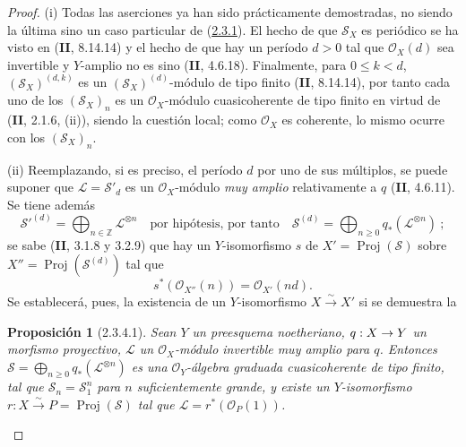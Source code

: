 \documentclass[10pt,oneside,openany]{book}
\theoremstyle{egaenv}\newtheorem*{env}{---}
\theoremstyle{egastatement}
\newtheorem*{proposition}{Proposición}
\theoremstyle{egadescription}
\newcommand{\oldpage}[2][]{\marginnote{\normalfont\scriptsize\textbf{#1}\,|\,#2}\ignorespaces}
\renewcommand{\leq}{\leqslant}
\renewcommand{\geq}{\geqslant}
\renewcommand{\to}{\mathchoice{\longrightarrow}{\rightarrow}{\rightarrow}{\rightarrow}}
\begin{document}
\begin{proof}
(i) Todas las aserciones ya han sido prácticamente demostradas, no siendo la última sino un caso particular de (\hyperref[III.2.3.1-fr]{2.3.1}). El hecho de que $\mathcal S_X$ es periódico se ha visto en (\textbf{II}, 8.14.14) y el hecho de que hay un período $d>0$ tal que $\mathcal O_X(d)$ sea invertible y $Y$-amplio no es sino (\textbf{II}, 4.6.18). Finalmente, para $0\leq k<d$, $(\mathcal S_X)^{(d,k)}$ es un $(\mathcal S_X)^{(d)}$-módulo de tipo finito (\textbf{II}, 8.14.14), por tanto cada uno de los $(\mathcal S_X)_n$ es un $\mathcal O_X$-módulo cuasicoherente de tipo finito en virtud de (\textbf{II}, 2.1.6, (ii)), siendo la cuestión local; como $\mathcal O_X$ es coherente, lo mismo ocurre con los $(\mathcal S_X)_n$.

(ii) Reemplazando, si es preciso, el período $d$ por uno de sus múltiplos, se puede suponer que $\mathcal L=\mathcal S'_d$ es un $\mathcal O_X$-módulo \emph{muy amplio} relativamente a $q$ (\textbf{II}, 4.6.11). Se tiene además
\[
\mathcal S'^{(d)}=\bigoplus_{n\in\mathbb Z}\mathcal L^{\otimes n}
\quad\text{por hipótesis, por tanto}\quad
\mathcal S^{(d)}=\bigoplus_{n\geq0}q_*(\mathcal L^{\otimes n})~;
\]
se sabe (\textbf{II}, 3.1.8 y 3.2.9) que hay un $Y$-isomorfismo $s$ de $X'=\operatorname{Proj}(\mathcal S)$ sobre $X''=\operatorname{Proj}(\mathcal S^{(d)})$ tal que
\oldpage[III]{105}
\[
s^*(\mathcal O_{X''}(n))=\mathcal O_{X'}(nd).
\]
Se establecerá, pues, la existencia de un $Y$-isomorfismo $X\xrightarrow{\sim}X'$ si se demuestra la

\begin{proposition}[2.3.4.1]
\label{III.2.3.4.1-fr}
Sean $Y$ un preesquema noetheriano, $q:X\to Y$ un morfismo proyectivo, $\mathcal L$ un $\mathcal O_X$-módulo invertible muy amplio para $q$. Entonces $\mathcal S=\bigoplus_{n\geq0}q_*(\mathcal L^{\otimes n})$ es una $\mathcal O_Y$-álgebra graduada cuasicoherente de tipo finito, tal que $\mathcal S_n=\mathcal S_1^n$ para $n$ suficientemente grande, y existe un $Y$-isomorfismo $r:X\xrightarrow{\sim}P=\operatorname{Proj}(\mathcal S)$ tal que $\mathcal L=r^*(\mathcal O_P(1))$.
\end{proposition}


\end{proof}
\end{document}
